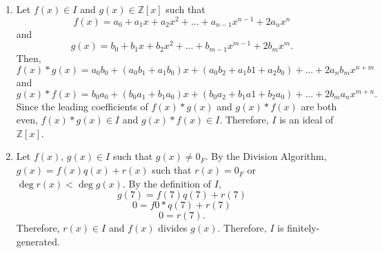 \documentclass{article}
\begin{document}
\begin{enumerate}
\item
Let $f(x) \in I$ and $g(x) \in \mathbb{Z}[x]$ such that
\[
f(x) = a_{0} + a_{1}x + a_{2}x^{2} + ... + a_{n-1}x^{n-1} + 2a_{n}x^n
\]
and
\[
g(x) = b_{0} + b_{1}x + b_{2}x^{2} + ... + b_{m-1}x^{m-1} + 2b_{m}x^m.
\]
Then,
\[
f(x)*g(x) = a_{0}b_{0} + (a_{0}b_{1} + a_{1}b_{0})x + (a_{0}b_{2}+a_{1}b{1}+a_{2}b_{0}) + ... + 2a_{n}b_{m}x^{n+m}
\]
and
\[
g(x)*f(x) = b_{0}a_{0} + (b_{0}a_{1} + b_{1}a_{0})x + (b_{0}a_{2}+b_{1}a{1}+b_{2}a_{0}) + ... + 2b_{m}a_{n}x^{m+n}.
\]
Since the leading coefficients of $f(x)*g(x)$ and $g(x)*f(x)$ are both even,
$f(x)*g(x) \in I$ and $g(x)*f(x) \in I$.  Therefore, $I$ is an ideal of $\mathbb{Z}[x]$.

\item Let $f(x)$, $g(x) \in I$ such that $g(x) \neq 0_{F}$.
By the Division Algorithm, $g(x) = f(x)q(x) + r(x)$ such that $r(x) = 0_{F}$
or $\deg r(x) < \deg g(x)$.  By the definition of $I$,
\[
g(7) = f(7)q(7) + r(7)
\]
\[
0 = f0*q(7) + r(7)
\]
\[
0 = r(7).
\]
Therefore, $r(x) \in I$ and $f(x)$ divides $g(x)$.  Therefore, $I$ is
finitely-generated.

\end{enumerate}
\end{document}
